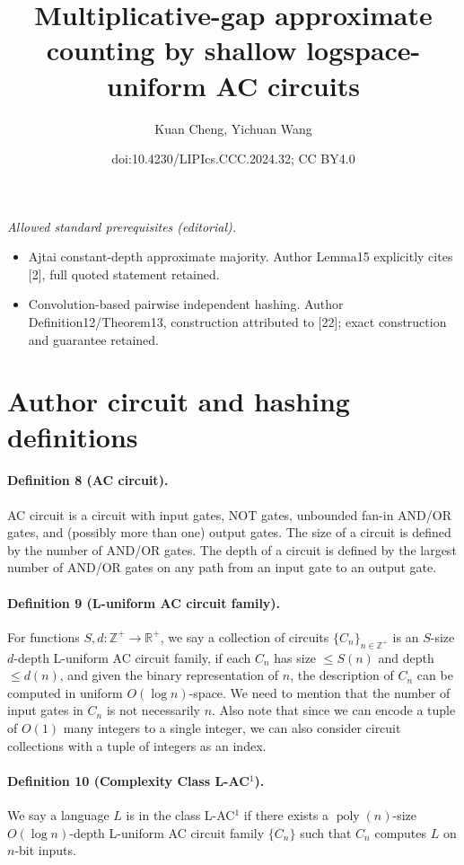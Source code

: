 \documentclass[10pt,a4paper]{article}
\title{Multiplicative-gap approximate counting by shallow logspace-uniform AC circuits}
\author{Kuan Cheng, Yichuan Wang}
\date{doi:10.4230/LIPIcs.CCC.2024.32; CC BY4.0}
\begin{document}
\maketitle
\noindent\textit{Allowed standard prerequisites (editorial).}\begin{itemize}
\item Ajtai constant-depth approximate majority. Author Lemma15 explicitly cites [2], full quoted statement retained.
\item Convolution-based pairwise independent hashing. Author Definition12/Theorem13, construction attributed to [22]; exact construction and guarantee retained.
\end{itemize}\medskip
\section*{Author circuit and hashing definitions}
\paragraph{Definition 8 (AC circuit).} AC circuit is a circuit with input gates, NOT gates, unbounded fan-in AND/OR gates, and (possibly more than one) output gates. The size of a circuit is defined by the number of AND/OR gates. The depth of a circuit is defined by the largest number of AND/OR gates on any path from an input gate to an output gate.
\paragraph{Definition 9 (L-uniform AC circuit family).} For functions $S,d:\mathbb Z^+\to\mathbb R^+$, we say a collection of circuits $\{C_n\}_{n\in\mathbb Z^+}$ is an $S$-size $d$-depth L-uniform AC circuit family, if each $C_n$ has size $\le S(n)$ and depth $\le d(n)$, and given the binary representation of $n$, the description of $C_n$ can be computed in uniform $O(\log n)$-space.
We need to mention that the number of input gates in $C_n$ is not necessarily $n$. Also note that since we can encode a tuple of $O(1)$ many integers to a single integer, we can also consider circuit collections with a tuple of integers as an index.
\paragraph{Definition 10 (Complexity Class L-AC$^1$).} We say a language $L$ is in the class L-AC$^1$ if there exists a $\operatorname{poly}(n)$-size $O(\log n)$-depth L-uniform AC circuit family $\{C_n\}$ such that $C_n$ computes $L$ on $n$-bit inputs.
\end{document}
